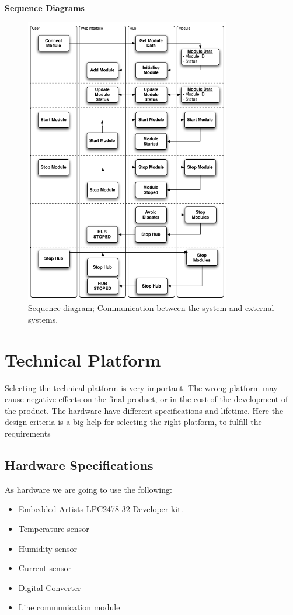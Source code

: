 \textbf{Sequence Diagrams}
\begin{figure}[H]
	\begin{centering}
		 \includegraphics[width=0.8\textwidth]{images/SequenceDiagram.png}
		\caption{Sequence diagram; Communication between the system and external systems.}
 	\end{centering}
\end{figure}

\section{Technical Platform}
Selecting the technical platform is very important. The wrong platform may cause negative effects on the final product, or in the cost of the development of the product. The hardware have different specifications and lifetime. Here the design criteria is a big help for selecting the right platform, to fulfill the requirements
\subsection{Hardware Specifications}
As hardware we are going to use the following:
\begin{itemize}
	\item Embedded Artists LPC2478-32 Developer kit.
	\item Temperature sensor
	\item Humidity sensor
	\item Current sensor
	\item Digital Converter
	\item Line communication module
\end{itemize}
